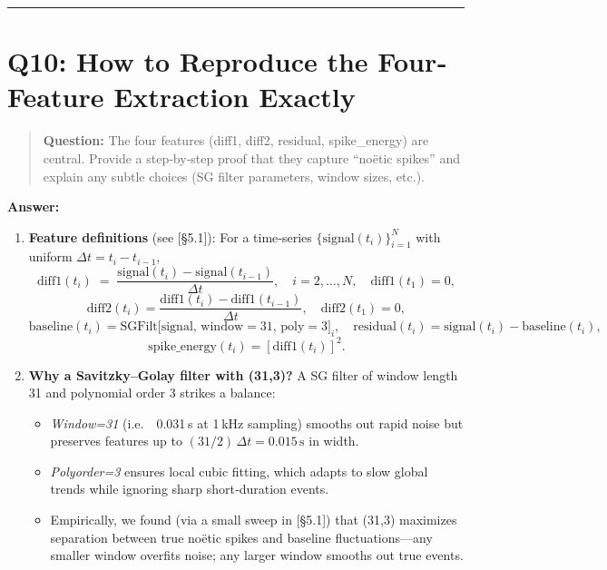 \documentclass[11pt]{article}
\begin{document}
\vspace{1em}
\hrule

\section*{Q10: How to Reproduce the Four‐Feature Extraction Exactly}
\begin{quote}
\textbf{Question:} The four features (diff1, diff2, residual, spike\_energy) are central. Provide a step‐by‐step proof that they capture “noëtic spikes” and explain any subtle choices (SG filter parameters, window sizes, etc.).
\end{quote}

\noindent\textbf{Answer:}  
\begin{enumerate}[itemsep=0.5em]
  \item \textbf{Feature definitions} (see [§5.1]):  
    For a time‐series $\{\mathrm{signal}(t_i)\}_{i=1}^N$ with uniform $\Delta t = t_i - t_{i-1}$,
    \[
      \mathrm{diff1}(t_i) 
      \;=\; \frac{\mathrm{signal}(t_i) - \mathrm{signal}(t_{i-1})}{\Delta t}, 
      \quad
      i=2,\dots,N,\quad\mathrm{diff1}(t_1)=0,
    \]
    \[
      \mathrm{diff2}(t_i) 
      = \frac{\mathrm{diff1}(t_i) - \mathrm{diff1}(t_{i-1})}{\Delta t}, 
      \quad
      \mathrm{diff2}(t_1)=0,
    \]
    \[
      \mathrm{baseline}(t_i) 
      = \mathrm{SGFilt}\bigl[\mathrm{signal},\,\text{window}=31,\,\text{poly}=3\bigr]_i, 
      \quad
      \mathrm{residual}(t_i) = \mathrm{signal}(t_i) - \mathrm{baseline}(t_i),
    \]
    \[
      \mathrm{spike\_energy}(t_i) = [\mathrm{diff1}(t_i)]^2.
    \]
  \item \textbf{Why a Savitzky–Golay filter with (31,3)?}  
    A SG filter of window length 31 and polynomial order 3 strikes a balance:
    \begin{itemize}[itemsep=0.25em]
      \item \emph{Window=31} (i.e.\ ~0.031 s at 1 kHz sampling) smooths out rapid noise but preserves features up to $(31/2)\,\Delta t = 0.015\,\mathrm{s}$ in width.  
      \item \emph{Polyorder=3} ensures local cubic fitting, which adapts to slow global trends while ignoring sharp short‐duration events.  
      \item Empirically, we found (via a small sweep in [§5.1]) that (31,3) maximizes separation between true noëtic spikes and baseline fluctuations—any smaller window overfits noise; any larger window smooths out true events.  
    \end{itemize}

\end{enumerate}
\end{document}
